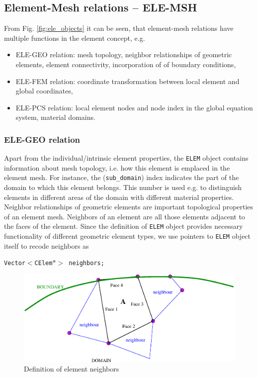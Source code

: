 \subsection{Element-Mesh relations -- ELE-MSH}
\label{sec:ele_msh}

From Fig. \ref{fig:ele_objects} it can be seen, that element-mesh
relations have multiple functions in the element concept, e.g.
\begin{itemize}
 \item ELE-GEO relation: mesh topology, neighbor relationships of
 geometric elements, element connectivity, incorporation of of boundary
 conditions,
 \item ELE-FEM relation: coordinate transformation between local
 element and global coordinates,
 \item ELE-PCS relation: local element nodes and node index in the
 global equation system, material domains.
\end{itemize}

\subsubsection{ELE-GEO relation}

Apart from the individual/intrinsic element properties, the
\texttt{ELEM} object contains information about mesh topology,
i.e. how this element is emplaced in the element mesh. For
instance, the (\texttt{sub\_domain}) index indicates the part of
the domain to which this element belongs. This number is used e.g.
to distinguish elements in different areas of the domain with
different material properties. Neighbor relationships of geometric
elements are important topological properties of an element mesh.
Neighbors of an element are all those elements adjacent to the
faces of the element. Since the definition of \texttt{ELEM} object
provides necessary functionality of different geometric element
types, we use pointers to \texttt{ELEM} object itself to recode
neighbors as

\texttt{Vector$<${}CElem$\ast>${}\ neighbors;}

\begin{figure}[H]
 \centering
\includegraphics[scale=0.6]{figures/neighbor.eps}
\caption{Definition of element neighbors} \label{fig:gnei}
\end{figure}

